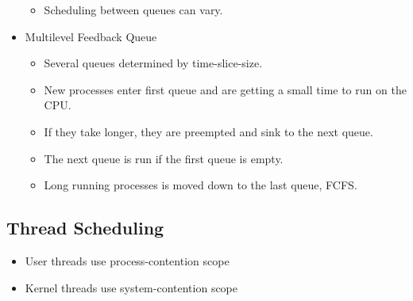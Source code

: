 \documentclass[a4wide,10pt]{article}
\begin{document}
\begin{itemize}
\begin{itemize}
		\item Scheduling between queues can vary.
	\end{itemize}
	\item Multilevel Feedback Queue
	\begin{itemize}
		\item Several queues determined by time-slice-size.
		\item New processes enter first queue and are getting a small time to run on the CPU.
		\item If they take longer, they are preempted and sink to the next queue.
		\item The next queue is run if the first queue is empty.
		\item Long running processes is moved down to the last queue, FCFS.
	\end{itemize}
\end{itemize}

\subsection{Thread Scheduling} %
\label{sub:thread_scheduling}
\begin{itemize}
	\item User threads use process-contention scope
	\item Kernel threads use system-contention scope
\end{itemize}
\end{document}
